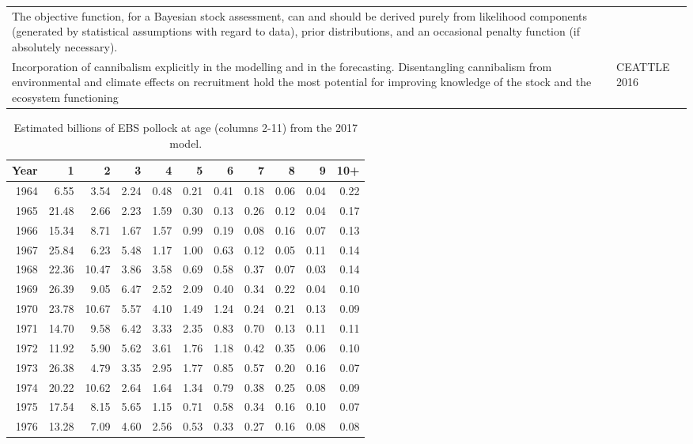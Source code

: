 \documentclass[]{article}
\begin{document}
\begin{table}[ht]
\begin{tabular}{p{4.0in}p{2.5in}}
The objective function, for a Bayesian stock assessment, can and should be derived purely from likelihood components (generated by statistical assumptions with regard to data), prior distributions, and an occasional penalty function (if absolutely necessary). &    \\
Incorporation of cannibalism explicitly in the modelling and in the forecasting. Disentangling cannibalism from environmental and climate effects on recruitment hold the most potential for improving knowledge of the stock and the ecosystem functioning &   CEATTLE 2016 \\
\hline
\end{tabular}
\end{table}

\begin{table}[ht]
\centering
\caption{Estimated billions of EBS pollock at age (columns 2-11) from the 2017 model.} 
\label{tab:natage}
\begin{tabular}{rrrrrrrrrrr}
  \hline
Year & 1 & 2 & 3 & 4 & 5 & 6 & 7 & 8 & 9 & 10+ \\ 
  \hline
1964 & 6.55 & 3.54 & 2.24 & 0.48 & 0.21 & 0.41 & 0.18 & 0.06 & 0.04 & 0.22 \\ 
  1965 & 21.48 & 2.66 & 2.23 & 1.59 & 0.30 & 0.13 & 0.26 & 0.12 & 0.04 & 0.17 \\ 
  1966 & 15.34 & 8.71 & 1.67 & 1.57 & 0.99 & 0.19 & 0.08 & 0.16 & 0.07 & 0.13 \\ 
  1967 & 25.84 & 6.23 & 5.48 & 1.17 & 1.00 & 0.63 & 0.12 & 0.05 & 0.11 & 0.14 \\ 
  1968 & 22.36 & 10.47 & 3.86 & 3.58 & 0.69 & 0.58 & 0.37 & 0.07 & 0.03 & 0.14 \\ 
  1969 & 26.39 & 9.05 & 6.47 & 2.52 & 2.09 & 0.40 & 0.34 & 0.22 & 0.04 & 0.10 \\ 
  1970 & 23.78 & 10.67 & 5.57 & 4.10 & 1.49 & 1.24 & 0.24 & 0.21 & 0.13 & 0.09 \\ 
  1971 & 14.70 & 9.58 & 6.42 & 3.33 & 2.35 & 0.83 & 0.70 & 0.13 & 0.11 & 0.11 \\ 
  1972 & 11.92 & 5.90 & 5.62 & 3.61 & 1.76 & 1.18 & 0.42 & 0.35 & 0.06 & 0.10 \\ 
  1973 & 26.38 & 4.79 & 3.35 & 2.95 & 1.77 & 0.85 & 0.57 & 0.20 & 0.16 & 0.07 \\ 
  1974 & 20.22 & 10.62 & 2.64 & 1.64 & 1.34 & 0.79 & 0.38 & 0.25 & 0.08 & 0.09 \\ 
  1975 & 17.54 & 8.15 & 5.65 & 1.15 & 0.71 & 0.58 & 0.34 & 0.16 & 0.10 & 0.07 \\ 
  1976 & 13.28 & 7.09 & 4.60 & 2.56 & 0.53 & 0.33 & 0.27 & 0.16 & 0.08 & 0.08 \\ 

\end{tabular}
\end{table}
\end{document}
